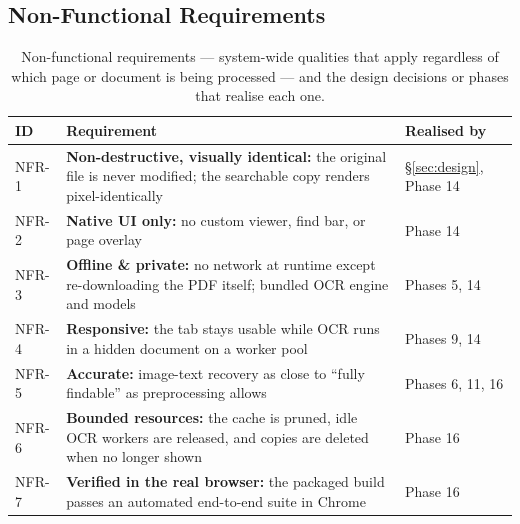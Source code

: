 \subsection{Non-Functional Requirements}
\begin{table}[ht]
  \centering
  \caption{Non-functional requirements --- system-wide qualities that apply
           regardless of which page or document is being processed --- and the
           design decisions or phases that realise each one.}
  \label{tab:nfr}
  \renewcommand{\arraystretch}{1.3}
  \begin{tabularx}{\textwidth}{@{}l X >{\raggedright\arraybackslash}p{2.6cm}@{}}
    \toprule
    \textbf{ID} & \textbf{Requirement} & \textbf{Realised by} \\
    \midrule
    NFR-1 & \textbf{Non-destructive, visually identical:} the original file is never modified; the searchable copy renders pixel-identically & \S\ref{sec:design}, Phase 14 \\
    NFR-2 & \textbf{Native UI only:} no custom viewer, find bar, or page overlay & Phase 14 \\
    NFR-3 & \textbf{Offline \& private:} no network at runtime except re-downloading the PDF itself; bundled OCR engine and models & Phases 5, 14 \\
    NFR-4 & \textbf{Responsive:} the tab stays usable while OCR runs in a hidden document on a worker pool & Phases 9, 14 \\
    NFR-5 & \textbf{Accurate:} image-text recovery as close to ``fully findable'' as preprocessing allows & Phases 6, 11, 16 \\
    NFR-6 & \textbf{Bounded resources:} the cache is pruned, idle OCR workers are released, and copies are deleted when no longer shown & Phase 16 \\
    NFR-7 & \textbf{Verified in the real browser:} the packaged build passes an automated end-to-end suite in Chrome & Phase 16 \\
    \bottomrule
  \end{tabularx}
\end{table}
